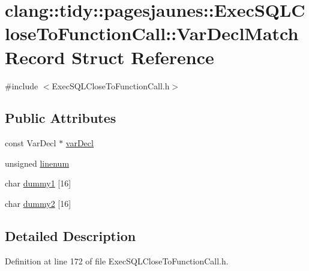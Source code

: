 \hypertarget{structclang_1_1tidy_1_1pagesjaunes_1_1_exec_s_q_l_close_to_function_call_1_1_var_decl_match_record}{}\section{clang\+:\+:tidy\+:\+:pagesjaunes\+:\+:Exec\+S\+Q\+L\+Close\+To\+Function\+Call\+:\+:Var\+Decl\+Match\+Record Struct Reference}
\label{structclang_1_1tidy_1_1pagesjaunes_1_1_exec_s_q_l_close_to_function_call_1_1_var_decl_match_record}


{\ttfamily \#include $<$Exec\+S\+Q\+L\+Close\+To\+Function\+Call.\+h$>$}

\subsection*{Public Attributes}
\begin{DoxyCompactItemize}
\item 
const Var\+Decl $\ast$ \hyperlink{structclang_1_1tidy_1_1pagesjaunes_1_1_exec_s_q_l_close_to_function_call_1_1_var_decl_match_record_adba919dc2029cfcbb742ad4101828f9b}{var\+Decl}
\item 
unsigned \hyperlink{structclang_1_1tidy_1_1pagesjaunes_1_1_exec_s_q_l_close_to_function_call_1_1_var_decl_match_record_af9135007942a3f313e8b33f93cb50836}{linenum}
\item 
char \hyperlink{structclang_1_1tidy_1_1pagesjaunes_1_1_exec_s_q_l_close_to_function_call_1_1_var_decl_match_record_aaeba223f40be864f154ef2641a3b1e52}{dummy1} \mbox{[}16\mbox{]}
\item 
char \hyperlink{structclang_1_1tidy_1_1pagesjaunes_1_1_exec_s_q_l_close_to_function_call_1_1_var_decl_match_record_ae2d75d33b8ccd3626a5839c1a2d28e21}{dummy2} \mbox{[}16\mbox{]}
\end{DoxyCompactItemize}


\subsection{Detailed Description}


Definition at line 172 of file Exec\+S\+Q\+L\+Close\+To\+Function\+Call.\+h.



